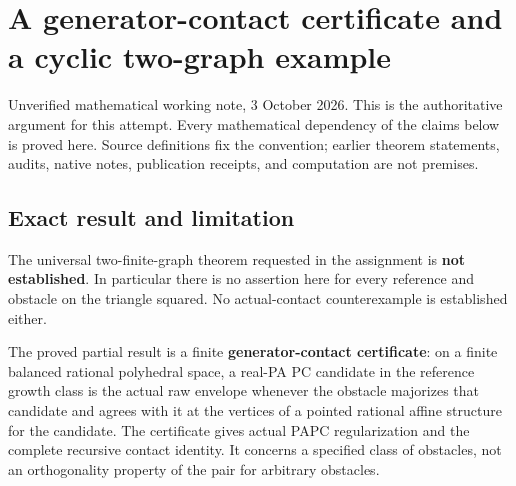 \documentclass[
  10pt,
]{article}
\author{}
\date{}
\begin{document}
\section{A generator-contact certificate and a cyclic two-graph
example}\label{a-generator-contact-certificate-and-a-cyclic-two-graph-example}

Unverified mathematical working note, 3 October 2026. This is the
authoritative argument for this attempt. Every mathematical dependency
of the claims below is proved here. Source definitions fix the
convention; earlier theorem statements, audits, native notes,
publication receipts, and computation are not premises.

\subsection{Exact result and
limitation}\label{exact-result-and-limitation}

The universal two-finite-graph theorem requested in the assignment is
\textbf{not established}. In particular there is no assertion here for
every reference and obstacle on the triangle squared. No actual-contact
counterexample is established either.

The proved partial result is a finite \textbf{generator-contact
certificate}: on a finite balanced rational polyhedral space, a real-PA
PC candidate in the reference growth class is the actual raw envelope
whenever the obstacle majorizes that candidate and agrees with it at the
vertices of a pointed rational affine structure for the candidate. The
certificate gives actual PAPC regularization and the complete recursive
contact identity. It concerns a specified class of obstacles, not an
orthogonality property of the pair for arbitrary obstacles.
\end{document}
